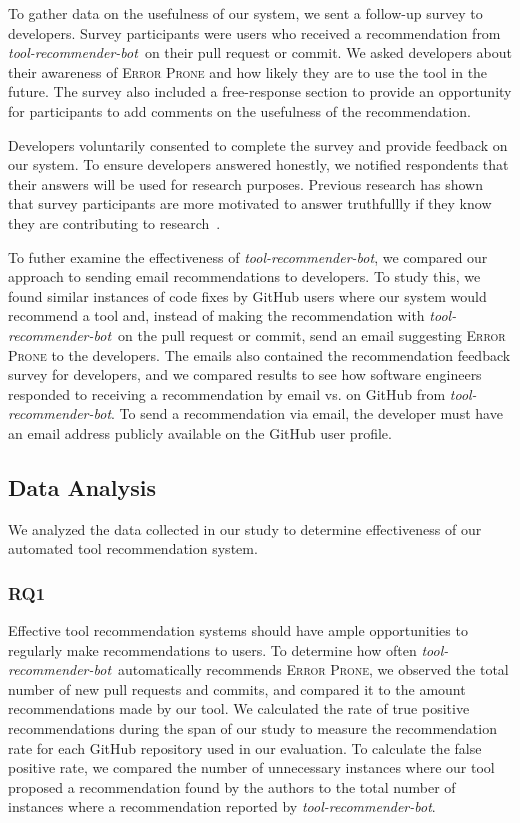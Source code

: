 \documentclass[sigconf,review,anonymous]{acmart}
\newcommand{\tool}{\textsl{tool-recommender-bot}}
\begin{document}
To gather data on the usefulness of our system, we sent a follow-up survey to developers. Survey participants were users who received a recommendation from \tool~on their pull request or commit. We asked developers about their awareness of \textsc{Error Prone} and how likely they are to use the tool in the future. The survey also included a free-response section to provide an opportunity for participants to add comments on the usefulness of the recommendation.

Developers voluntarily consented to complete the survey and provide feedback on our system. To ensure developers answered honestly, we notified respondents that their answers will be used for research purposes. Previous research has shown that survey participants are more motivated to answer truthfullly if they know they are contributing to research~\cite{Krosnick1991Research}. 

To futher examine the effectiveness of \tool, we compared our approach to sending email recommendations to developers. To study this, we found similar instances of code fixes by GitHub users where our system would recommend a tool and, instead of making the recommendation with \tool~on the pull request or commit, send an email suggesting \textsc{Error Prone} to the developers. The emails also contained the recommendation feedback survey for developers, and we compared results to see how software engineers responded to receiving a recommendation by email vs. on GitHub from \tool. To send a recommendation via email, the developer must have an email address publicly available on the GitHub user profile. 

\subsection{Data Analysis}

We analyzed the data collected in our study to determine effectiveness of our automated tool recommendation system.

\subsubsection{RQ1}

Effective tool recommendation systems should have ample opportunities to regularly make recommendations to users. To determine how often \tool~automatically recommends \textsc{Error Prone}, we observed the total number of new pull requests and commits, and compared it to the amount recommendations made by our tool. We calculated the rate of true positive recommendations during the span of our study to measure the recommendation rate for each GitHub repository used in our evaluation. To calculate the false positive rate, we compared the number of unnecessary instances where our tool proposed a recommendation found by the authors to the total number of instances where a recommendation reported by \tool.
\end{document}
